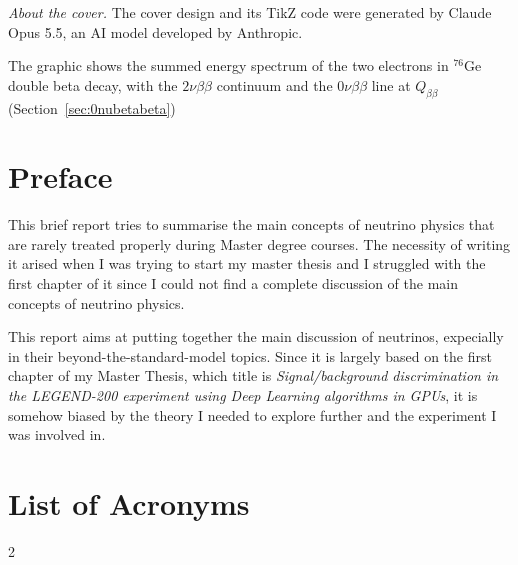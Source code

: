 \documentclass[11pt,a4paper]{book}
\newcommand{\chapterTitleSize}{\fontsize{36pt}{44pt}\selectfont}
\begin{document}


\thispagestyle{empty}
\null\vfill
\begin{flushleft}\small
\textit{About the cover.} The cover design and its TikZ code were generated by Claude Opus 5.5, an AI model developed by Anthropic.

The graphic shows the summed energy spectrum of the two electrons in ${}^{76}$Ge double beta decay, with the $2\nu\beta\beta$ continuum and the $0\nu\beta\beta$ line at $Q_{\beta\beta}$ (Section~\ref{sec:0nubetabeta})
\end{flushleft}
\clearpage


\chapter*{Preface}
This brief report tries to summarise the main concepts of neutrino physics that are rarely treated properly during Master degree courses. The necessity of writing it arised when I was trying to start my master thesis and I struggled with the first chapter of it since I could not find a complete discussion of the main concepts of neutrino physics. 

This report aims at putting together the main discussion of neutrinos, expecially in their beyond-the-standard-model topics. Since it is largely based on the first chapter of my Master Thesis, which title is \textit{Signal/background discrimination in the LEGEND-200 experiment using Deep Learning algorithms in GPUs}, it is somehow biased by the theory I needed to explore further and the experiment I was involved in.

\tableofcontents
\clearpage






\renewcommand{\chapterTitleSize}{\fontsize{36pt}{44pt}\selectfont}

\chapter*{List of Acronyms}

\begin{multicols}{2}
    \printacronyms[heading=none]
\end{multicols}

\cleardoublepage
{}
{}
\printbibliography
\end{document}
